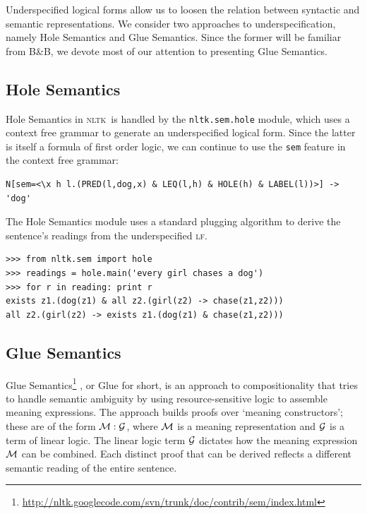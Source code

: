 \documentclass[11pt, a4paper]{article}
\newcommand{\BB}{\textsc{B{\small\&}B}}
\newcommand{\LF}{\textsc{lf}}
\newcommand{\NLTK}{\textsc{nltk}}
\begin{document}
Underspecified logical forms allow us to loosen the relation between
syntactic and semantic representations. We consider two approaches to
underspecification, namely Hole
Semantics and Glue Semantics. Since the former will be familiar from 
\BB, we devote most of our attention to presenting Glue
Semantics.

\subsection{Hole Semantics}

Hole Semantics in \NLTK\ is handled by the
\texttt{nltk.sem.hole} module, which uses a context free grammar to
generate an underspecified logical form.  Since the latter is itself a
formula of first order logic, we can continue to use the \texttt{sem} feature
in the context free grammar:
\begin{Verbatim}[frame=none,fontsize=\small]
N[sem=<\x h l.(PRED(l,dog,x) & LEQ(l,h) & HOLE(h) & LABEL(l))>] -> 'dog'
\end{Verbatim}
The Hole Semantics module uses a standard plugging algorithm to derive the
sentence's readings from the underspecified \LF.
\begin{Verbatim}
>>> from nltk.sem import hole
>>> readings = hole.main('every girl chases a dog')
>>> for r in reading: print r
exists z1.(dog(z1) & all z2.(girl(z2) -> chase(z1,z2)))
all z2.(girl(z2) -> exists z1.(dog(z1) & chase(z1,z2)))
\end{Verbatim}


\subsection{Glue Semantics}
Glue Semantics\footnote{\url{http://nltk.googlecode.com/svn/trunk/doc/contrib/sem/index.html}}
 \citep{Dalrymple:1999:RRB}, or Glue for
short, is an approach to compositionality that tries to handle
semantic ambiguity by using resource-sensitive logic to assemble
meaning expressions.
The approach builds proofs over `meaning constructors'; these are of the
form $\cal{M}: \cal{G}$, where $\cal{M}$ is a meaning representation and
$\cal{G}$ is a term of linear logic.  The linear logic term $\cal{G}$
dictates how the meaning expression $\cal{M}$ can be combined.  Each
distinct proof that can be derived reflects a different semantic
reading of the entire sentence.
\end{document}
